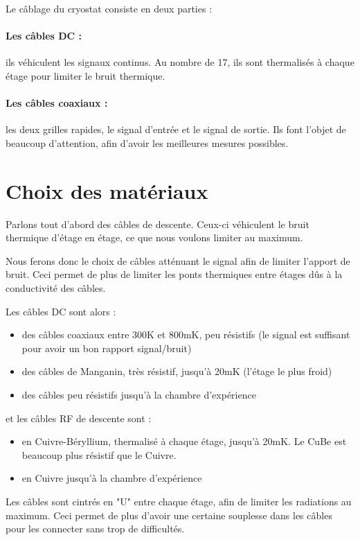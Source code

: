 \documentclass[a4paper,11pt]{report}
\begin{document}
Le câblage du cryostat consiste en deux parties : 
\paragraph*{Les câbles DC : } ils véhiculent les signaux continus. Au nombre de 17, ils sont thermalisés à chaque étage pour limiter le bruit thermique.
\paragraph*{Les câbles coaxiaux : } les deux grilles rapides, le signal d'entrée et le signal de sortie. Ils font l'objet de beaucoup d'attention, afin d'avoir les meilleures mesures possibles.


\section{Choix des matériaux}
Parlons tout d'abord des câbles de descente. Ceux-ci véhiculent le bruit thermique d'étage en étage, ce que nous voulons limiter au maximum.

Nous ferons donc le choix de câbles atténuant le signal afin de limiter l'apport de bruit. Ceci permet de plus de limiter les ponts thermiques entre étages dûs à la conductivité des câbles.
\newline

Les câbles DC sont alors :
\begin{itemize}
    \item des câbles coaxiaux entre 300K et 800mK, peu résistifs (le signal est suffisant pour avoir un bon rapport signal/bruit)
    \item des câbles de Manganin, très résistif, jusqu'à 20mK (l'étage le plus froid)
    \item des câbles peu résistifs jusqu'à la chambre d'expérience
\end{itemize}

et les câbles RF de descente sont :
\begin{itemize}
    \item en Cuivre-Béryllium, thermalisé à chaque étage, jusqu'à 20mK. Le CuBe est beaucoup plus résistif que le Cuivre.
    \item en Cuivre jusqu'à la chambre d'expérience
\end{itemize}

Les câbles sont cintrés en "U" entre chaque étage, afin de limiter les radiations au maximum. Ceci permet de plus d'avoir une certaine souplesse dans les câbles pour les connecter sans trop de difficultés.
\end{document}
